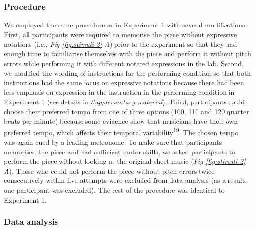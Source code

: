 \documentclass[
  man,floatsintext]{apa6}
\begin{document}
\hypertarget{procedure-2}{%
\subsubsection{Procedure}\label{procedure-2}}

We employed the same procedure as in Experiment 1 with several modifications. First, all participants were required to memorise the piece without expressive notations (i.e., \emph{Fig \ref{fig:stimuli-2} A}) prior to the experiment so that they had enough time to familiarise themselves with the piece and perform it without pitch errors while performing it with different notated expressions in the lab. Second, we modified the wording of instructions for the performing condition so that both instructions had the same focus on expressive notations because there had been less emphasis on expression in the instruction in the performing condition in Experiment 1 (see details in \emph{\protect\hyperlink{supplementary}{Supplementary material}}). Third, participants could choose their preferred tempo from one of three options (100, 110 and 120 quarter beats per minute) because some evidence show that musicians have their own preferred tempo, which affects their temporal variability\textsuperscript{19}. The chosen tempo was again cued by a leading metronome. To make sure that participants memorised the piece and had sufficient motor skills, we asked participants to perform the piece without looking at the original sheet music (\emph{Fig \ref{fig:stimuli-2} A}). Those who could not perform the piece without pitch errors twice consecutively within five attempts were excluded from data analysis (as a result, one participant was excluded). The rest of the procedure was identical to Experiment 1.

\hypertarget{data-analysis-1}{%
\subsubsection{Data analysis}\label{data-analysis-1}}
\end{document}
